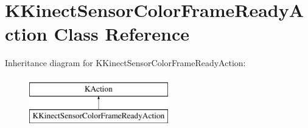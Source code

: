 \hypertarget{class_k_kinect_sensor_color_frame_ready_action}{\section{\-K\-Kinect\-Sensor\-Color\-Frame\-Ready\-Action \-Class \-Reference}
\label{class_k_kinect_sensor_color_frame_ready_action}
}
\-Inheritance diagram for \-K\-Kinect\-Sensor\-Color\-Frame\-Ready\-Action\-:\begin{figure}[H]
\begin{center}
\leavevmode
\includegraphics[height=2.000000cm]{class_k_kinect_sensor_color_frame_ready_action}
\end{center}
\end{figure}
